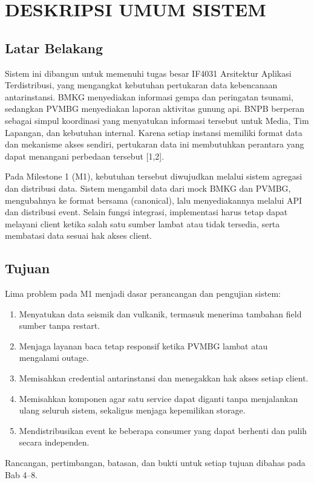\chapter{DESKRIPSI UMUM SISTEM}

\section{Latar Belakang}
Sistem ini dibangun untuk memenuhi tugas besar IF4031 Arsitektur Aplikasi Terdistribusi, yang mengangkat kebutuhan pertukaran data kebencanaan antarinstansi. BMKG menyediakan informasi gempa dan peringatan tsunami, sedangkan PVMBG menyediakan laporan aktivitas gunung api. BNPB berperan sebagai simpul koordinasi yang menyatukan informasi tersebut untuk Media, Tim Lapangan, dan kebutuhan internal. Karena setiap instansi memiliki format data dan mekanisme akses sendiri, pertukaran data ini membutuhkan perantara yang dapat menangani perbedaan tersebut [1,2].

Pada Milestone 1 (M1), kebutuhan tersebut diwujudkan melalui sistem agregasi dan distribusi data. Sistem mengambil data dari mock BMKG dan PVMBG, mengubahnya ke format bersama (canonical), lalu menyediakannya melalui API dan distribusi event. Selain fungsi integrasi, implementasi harus tetap dapat melayani client ketika salah satu sumber lambat atau tidak tersedia, serta membatasi data sesuai hak akses client.

\section{Tujuan}
Lima problem pada M1 menjadi dasar perancangan dan pengujian sistem:
\begin{enumerate}
  \item Menyatukan data seismik dan vulkanik, termasuk menerima tambahan field sumber tanpa restart.
  \item Menjaga layanan baca tetap responsif ketika PVMBG lambat atau mengalami outage.
  \item Memisahkan credential antarinstansi dan menegakkan hak akses setiap client.
  \item Memisahkan komponen agar satu service dapat diganti tanpa menjalankan ulang seluruh sistem, sekaligus menjaga kepemilikan storage.
  \item Mendistribusikan event ke beberapa consumer yang dapat berhenti dan pulih secara independen.
\end{enumerate}
Rancangan, pertimbangan, batasan, dan bukti untuk setiap tujuan dibahas pada Bab 4--8.

